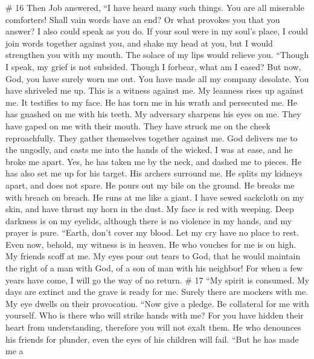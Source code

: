 \# 16  Then Job answered,  ``I have heard many
such things. You are all miserable comforters!  Shall vain
words have an end? Or what provokes you that you answer?  I
also could speak as you do. If your soul were in my soul's place, I
could join words together against you, and shake my head at you,
 but I would strengthen you with my mouth. The solace of my
lips would relieve you.  ``Though I speak, my grief is not
subsided. Though I forbear, what am I eased?  But now, God,
you have surely worn me out. You have made all my company desolate.
 You have shriveled me up. This is a witness against me. My
leanness rises up against me. It testifies to my face.  He
has torn me in his wrath and persecuted me. He has gnashed on me with
his teeth. My adversary sharpens his eyes on me.  They have
gaped on me with their mouth. They have struck me on the cheek
reproachfully. They gather themselves together against me. 
God delivers me to the ungodly, and casts me into the hands of the
wicked.  I was at ease, and he broke me apart. Yes, he has
taken me by the neck, and dashed me to pieces. He has also set me up for
his target.  His archers surround me. He splits my kidneys
apart, and does not spare. He pours out my bile on the ground.
 He breaks me with breach on breach. He runs at me like a
giant.  I have sewed sackcloth on my skin, and have thrust
my horn in the dust.  My face is red with weeping. Deep
darkness is on my eyelids,  although there is no violence
in my hands, and my prayer is pure.  ``Earth, don't cover
my blood. Let my cry have no place to rest.  Even now,
behold, my witness is in heaven. He who vouches for me is on high.
 My friends scoff at me. My eyes pour out tears to God,
 that he would maintain the right of a man with God, of a
son of man with his neighbor!  For when a few years have
come, I will go the way of no return. \# 17  ``My spirit is
consumed. My days are extinct and the grave is ready for me.
 Surely there are mockers with me. My eye dwells on their
provocation.  ``Now give a pledge. Be collateral for me with
yourself. Who is there who will strike hands with me?  For
you have hidden their heart from understanding, therefore you will not
exalt them.  He who denounces his friends for plunder, even
the eyes of his children will fail.  ``But he has made me a
